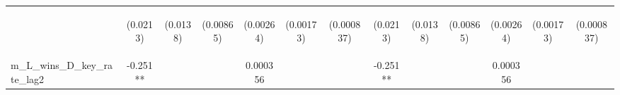 \documentclass[]{article}
\begin{document}
\begin{center}
\begin{tabular}{lcccccccccccc}
\vspace{4pt} & \begin{footnotesize}(0.0213)\end{footnotesize} & \begin{footnotesize}(0.0138)\end{footnotesize} & \begin{footnotesize}(0.00865)\end{footnotesize} & \begin{footnotesize}(0.00264)\end{footnotesize} & \begin{footnotesize}(0.00173)\end{footnotesize} & \begin{footnotesize}(0.000837)\end{footnotesize} & \begin{footnotesize}(0.0213)\end{footnotesize} & \begin{footnotesize}(0.0138)\end{footnotesize} & \begin{footnotesize}(0.00865)\end{footnotesize} & \begin{footnotesize}(0.00264)\end{footnotesize} & \begin{footnotesize}(0.00173)\end{footnotesize} & \begin{footnotesize}(0.000837)\end{footnotesize} \\
m\_L\_wins\_D\_key\_rate\_lag2 & -0.251** &  &  & 0.000356 &  &  & -0.251** &  &  & 0.000356 &  &  \\

\end{tabular}
\end{center}
\end{document}
